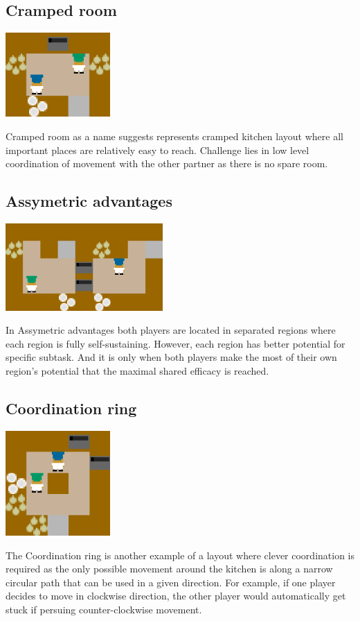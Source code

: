\par 
\subsection*{Cramped room}\label{CrampedRoom}
\begin{center}
    \includegraphics*[width=4cm]{../img/cramped_room_layout.png}
\end{center}
Cramped room as a name suggests represents cramped kitchen layout where all important places are relatively easy to reach. Challenge lies in low level coordination of movement with the other partner as there is no spare room.

    

\subsection*{Assymetric advantages}
\begin{center}
    \includegraphics*[width=6cm]{../img/asymmetric_advantages_layout.png}
\end{center}
In Assymetric advantages both players are located in separated regions where each region is fully self-sustaining. However, each region has better potential for specific subtask. 
And it is only when both players make the most of their own region's potential that the maximal shared efficacy is reached.

\subsection*{Coordination ring}
\begin{center}
    \includegraphics*[width=4cm]{../img/coordination_ring_layout.png}
\end{center}
The Coordination ring is another example of a layout where clever coordination is required as the only possible movement around the kitchen is along a narrow circular path that can be used in a given direction.
For example, if one player decides to move in clockwise direction, the other player would automatically get stuck if persuing counter-clockwise movement.


